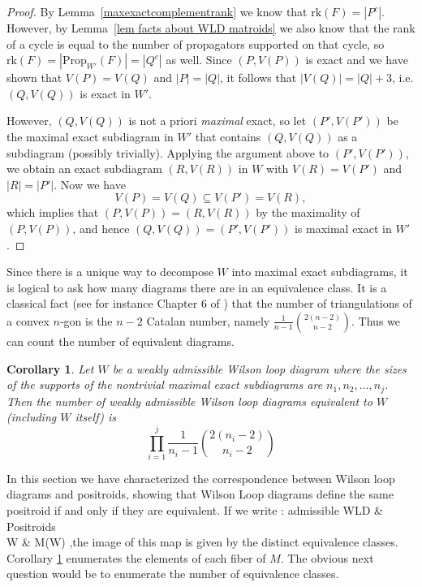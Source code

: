 \documentclass[11pt]{article}
\newcommand{\rk}{\textrm{rk} }
\def\bas #1\eas{\begin{align*} #1 \end{align*}}
\newcommand{\Prop}{\textrm{Prop}}
\newtheorem{cor}[thm]{Corollary}
\theoremstyle{remark}
\theoremstyle{definition}
\begin{document}
\begin{proof}
By Lemma~\ref{maxexactcomplementrank} we know that $\rk(F) = |P^c|$. However, by Lemma~\ref{lem facts about WLD matroids} we also know that the rank of a cycle is equal to the number of propagators supported on that cycle, so $\rk(F) = |\Prop_{W'}(F)| = |Q^c|$ as well. Since $(P,V(P))$ is exact and we have shown that $V(P) = V(Q)$ and $|P| = |Q|$, it follows that $|V(Q)| = |Q| + 3$, i.e.  $(Q,V(Q))$ is exact in $W'$.

However, $(Q,V(Q))$ is not a priori {\em maximal} exact, so let $(P',V(P'))$ be the maximal exact subdiagram in $W'$ that contains $(Q,V(Q))$ as a subdiagram (possibly trivially). Applying the argument above to $(P',V(P'))$, we obtain an exact subdiagram $(R,V(R))$ in $W$ with $V(R) = V(P')$ and $|R| = |P'|$. Now we have
\[V(P) = V(Q) \subseteq V(P') = V(R),\]
which implies that $(P,V(P)) = (R,V(R))$ by the maximality of $(P,V(P))$, and hence $(Q,V(Q)) = (P',V(P'))$ is maximal exact in $W'$.
\end{proof}


Since there is a unique way to decompose $W$ into maximal exact subdiagrams, it is logical to ask how many diagrams there are in an equivalence class. It is a classical fact (see for instance Chapter 6 of \cite{Stanley}) that the number of triangulations of a convex $n$-gon is the $n-2$ Catalan number, namely $\frac{1}{n-1}\binom{2(n-2)}{n-2}$.  Thus we can count the number of equivalent diagrams.

\begin{cor}\label{number of equiv diagrams}
  Let $W$ be a weakly admissible Wilson loop diagram where the sizes of the supports of the nontrivial maximal exact subdiagrams are $n_1, n_2, \ldots, n_j$.  Then the number of weakly admissible Wilson loop diagrams equivalent to $W$ (including $W$ itself) is
  \[
  \prod_{i=1}^{j} \frac{1}{n_i-1}\binom{2(n_i-2)}{n_i-2}
  \]
\end{cor}

In this section we have characterized the correspondence between Wilson loop diagrams and positroids, showing that Wilson Loop diagrams define the same positroid if and only if they are equivalent. If we write \bas M: \textrm{admissible WLD} & \longrightarrow \textrm{Positroids} \\ W & \mapsto M(W) \;,\eas the image of this map is given by the distinct equivalence classes. Corollary \ref{number of equiv diagrams} enumerates the elements of each fiber of $M$.  The obvious next question would be to enumerate the number of equivalence classes. 
\end{document}
